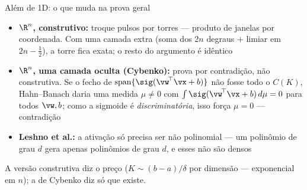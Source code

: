 \documentclass[aspectratio=169, 11pt]{beamer}
\begin{document}
\begin{frame}{Além de 1D: o que muda na prova geral}

  \begin{itemize}\setlength{\itemsep}{0.35ex}
    \item \textbf{$\R^n$, construtivo:} troque pulsos por torres —
          produto de janelas por coordenada. Com uma camada extra (soma dos
          $2n$ degraus $+$ limiar em $2n - \tfrac{1}{2}$), a torre fica
          exata; o resto do argumento é idêntico
    \item \textbf{$\R^n$, uma camada oculta (Cybenko):} prova por
          contradição, não construtiva. Se o fecho de
          $\operatorname{span}\{\sig(\vw^{\!\top}\vx + b)\}$ não fosse todo
          o $C(K)$, Hahn--Banach daria uma medida $\mu \ne 0$ com
          $\int \sig(\vw^{\!\top}\vx + b)\, d\mu = 0$ para todos $\vw, b$;
          como a sigmoide é \emph{discriminatória}, isso força $\mu = 0$ —
          contradição
    \item \textbf{Leshno et al.:} a ativação só precisa ser
          \alert{não polinomial} — um polinômio de grau $d$ gera apenas
          polinômios de grau $d$, e esses não são densos
  \end{itemize}

  \smallskip
  {\small A versão construtiva diz o preço ($K \sim (b-a)/\delta$ por
  dimensão — exponencial em $n$); a de Cybenko diz só que existe.}
\end{frame}
\end{document}
